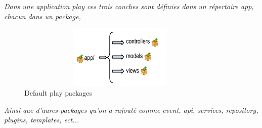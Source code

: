 \textit{Dans une application play ces trois couches sont définies dans un répertoire app, chacun dans un package,}
\begin{figure}[H]
        \centering
                \centering
                \includegraphics[width=10cm,height=3cm]{packages_play.png}
                \caption{Default play packages}
                \label{fig:Default play packages}
       
\end{figure}
\textit{Ainsi que d'aures packages qu'on a rajouté comme event, api, services, repository, plugins, templates, ect...}

